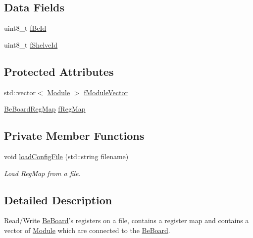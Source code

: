 \subsection*{Data Fields}
\begin{DoxyCompactItemize}
\item 
uint8\-\_\-t \hyperlink{class_ph2___hw_description_1_1_be_board_aabe1a515a23ff8813d4641293a8b4ba1}{f\-Be\-Id}
\item 
uint8\-\_\-t \hyperlink{class_ph2___hw_description_1_1_be_board_a8e45d863c0a596466a78fd3e16ef92d1}{f\-Shelve\-Id}
\end{DoxyCompactItemize}
\subsection*{Protected Attributes}
\begin{DoxyCompactItemize}
\item 
std\-::vector$<$ \hyperlink{class_ph2___hw_description_1_1_module}{Module} $>$ \hyperlink{class_ph2___hw_description_1_1_be_board_adcee78870a20c92fc8c060ff709a4baf}{f\-Module\-Vector}
\item 
\hyperlink{namespace_ph2___hw_description_a2e13fb82c8ed98154c60f9d0f8467d72}{Be\-Board\-Reg\-Map} \hyperlink{class_ph2___hw_description_1_1_be_board_a6db4850485715c0f23c97c3d621a781b}{f\-Reg\-Map}
\end{DoxyCompactItemize}
\subsection*{Private Member Functions}
\begin{DoxyCompactItemize}
\item 
void \hyperlink{class_ph2___hw_description_1_1_be_board_a1aaade58f564544b17de9509ad82cb0e}{load\-Config\-File} (std\-::string filename)
\begin{DoxyCompactList}\small\item\em Load Reg\-Map from a file. \end{DoxyCompactList}\end{DoxyCompactItemize}


\subsection{Detailed Description}
Read/\-Write \hyperlink{class_ph2___hw_description_1_1_be_board}{Be\-Board}'s registers on a file, contains a register map and contains a vector of \hyperlink{class_ph2___hw_description_1_1_module}{Module} which are connected to the \hyperlink{class_ph2___hw_description_1_1_be_board}{Be\-Board}. 

